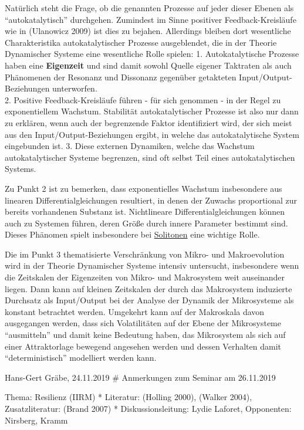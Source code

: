 \documentclass[11pt,a4paper]{article}
\begin{document}
Natürlich steht die Frage, ob die genannten Prozesse auf jeder dieser
Ebenen als ``autokatalytisch'' durchgehen. Zumindest im Sinne positiver
Feedback-Kreisläufe wie in (Ulanowicz 2009) ist dies zu bejahen.
Allerdings bleiben dort wesentliche Charakteristika autokatalytischer
Prozesse ausgeblendet, die in der Theorie Dynamischer Systeme eine
wesentliche Rolle spielen: 1. Autokatalytische Prozesse haben eine
\textbf{Eigenzeit} und sind damit sowohl Quelle eigener Taktraten als
auch Phänomenen der Resonanz und Dissonanz gegenüber getakteten
Input/Output-Beziehungen unterworfen.\\
2. Positive Feedback-Kreisläufe führen - für sich genommen - in der
Regel zu exponentiellem Wachstum. Stabilität autokatalytischer Prozesse
ist also nur dann zu erklären, wenn auch der begrenzende Faktor
identifiziert wird, der sich meist aus den Input/Output-Beziehungen
ergibt, in welche das autokatalytische System eingebunden ist. 3. Diese
externen Dynamiken, welche das Wachstum autokatalytischer Systeme
begrenzen, sind oft selbst Teil eines autokatalytischen Systems.

Zu Punkt 2 ist zu bemerken, dass exponentielles Wachstum insbesondere
aus linearen Differentialgleichungen resultiert, in denen der Zuwachs
proportional zur bereits vorhandenen Substanz ist. Nichtlineare
Differentialgleichungen können auch zu Systemen führen, deren Größe
durch innere Parameter bestimmt sind. Dieses Phänomen spielt
insbesondere bei \href{https://de.wikipedia.org/wiki/Soliton}{Solitonen}
eine wichtige Rolle.

Die im Punkt 3 thematisierte Verschränkung von Mikro- und Makroevolution
wird in der Theorie Dynamischer Systeme intensiv untersucht,
insbesondere wenn die Zeitskalen der Eigenzeiten von Mikro- und
Makrosystem weit auseinander liegen. Dann kann auf kleinen Zeitskalen
der durch das Makrosystem induzierte Durchsatz als Input/Output bei der
Analyse der Dynamik der Mikrosysteme als konstant betrachtet werden.
Umgekehrt kann auf der Makroskala davon ausgegangen werden, dass sich
Volatilitäten auf der Ebene der Mikrosysteme ``ausmitteln'' und damit
keine Bedeutung haben, das Mikrosystem als sich auf einer Attraktorlage
bewegend angesehen werden und dessen Verhalten damit ``deterministisch''
modelliert werden kann.

Hans-Gert Gräbe, 24.11.2019 \# Anmerkungen zum Seminar am 26.11.2019

Thema: Resilienz (IIRM) * Literatur: (Holling 2000), (Walker 2004),
Zusatzliteratur: (Brand 2007) * Diskussionsleitung: Lydie Laforet,
Opponenten: Nirsberg, Kramm
\end{document}
